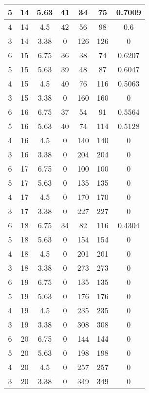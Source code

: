 \documentclass[letterpaper, 12pt]{article}
\begin{document}
\begin{longtable}{|c|c|c|c|c|c|c|}
\hline
5 & 14 & 5.63 & 41 & 34 & 75 & 0.7009 \\
\hline
4 & 14 & 4.5 & 42 & 56 & 98 & 0.6 \\
\hline
3 & 14 & 3.38 & 0 & 126 & 126 & 0 \\
\hline
6 & 15 & 6.75 & 36 & 38 & 74 & 0.6207 \\
\hline
5 & 15 & 5.63 & 39 & 48 & 87 & 0.6047 \\
\hline
4 & 15 & 4.5 & 40 & 76 & 116 & 0.5063 \\
\hline
3 & 15 & 3.38 & 0 & 160 & 160 & 0 \\
\hline
6 & 16 & 6.75 & 37 & 54 & 91 & 0.5564 \\
\hline
5 & 16 & 5.63 & 40 & 74 & 114 & 0.5128 \\
\hline
4 & 16 & 4.5 & 0 & 140 & 140 & 0 \\
\hline
3 & 16 & 3.38 & 0 & 204 & 204 & 0 \\
\hline
6 & 17 & 6.75 & 0 & 100 & 100 & 0 \\
\hline
5 & 17 & 5.63 & 0 & 135 & 135 & 0 \\
\hline
4 & 17 & 4.5 & 0 & 170 & 170 & 0 \\
\hline
3 & 17 & 3.38 & 0 & 227 & 227 & 0 \\
\hline
6 & 18 & 6.75 & 34 & 82 & 116 & 0.4304 \\
\hline
5 & 18 & 5.63 & 0 & 154 & 154 & 0 \\
\hline
4 & 18 & 4.5 & 0 & 201 & 201 & 0 \\
\hline
3 & 18 & 3.38 & 0 & 273 & 273 & 0 \\
\hline
6 & 19 & 6.75 & 0 & 135 & 135 & 0 \\
\hline
5 & 19 & 5.63 & 0 & 176 & 176 & 0 \\
\hline
4 & 19 & 4.5 & 0 & 235 & 235 & 0 \\
\hline
3 & 19 & 3.38 & 0 & 308 & 308 & 0 \\
\hline
6 & 20 & 6.75 & 0 & 144 & 144 & 0 \\
\hline
5 & 20 & 5.63 & 0 & 198 & 198 & 0 \\
\hline
4 & 20 & 4.5 & 0 & 257 & 257 & 0 \\
\hline
3 & 20 & 3.38 & 0 & 349 & 349 & 0 \\
\hline
\end{longtable}
\end{document}
